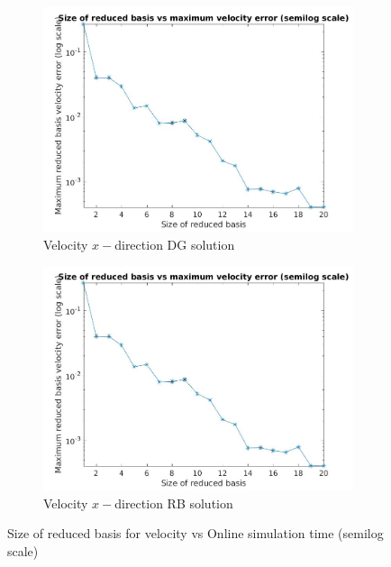 \documentclass[graybox]{svmult}
\begin{document}
\begin{figure}
\begin{subfigure}{0.48\textwidth}
\includegraphics[width=\linewidth]{size_vs_maximum_reduced_basis_velocity_error_semilog.jpg}
\caption{Velocity $x-$direction DG solution} \label{vel_x_dg}
\end{subfigure}\hspace*{\fill}
\begin{subfigure}{0.48\textwidth}
\includegraphics[width=\linewidth]{size_vs_maximum_reduced_basis_velocity_error_semilog.jpg}
\caption{Velocity $x-$direction RB solution} \label{vel_x_rb}
\end{subfigure}
  \caption{Size of reduced basis for velocity vs Online simulation time (semilog scale)} 
\label{online_simulation_time}
\end{figure}
\end{document}
